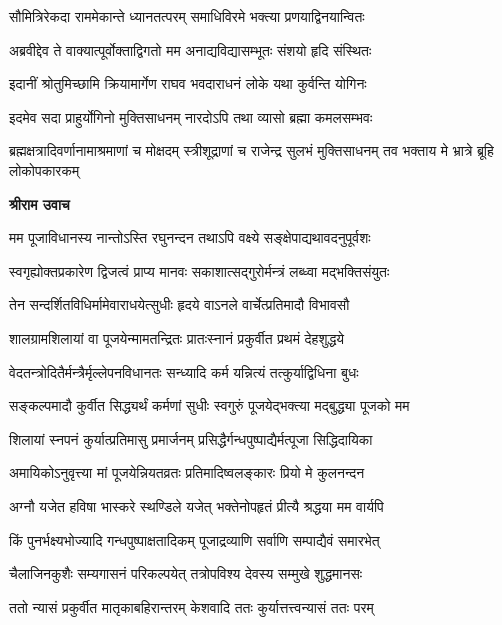 \twolineshloka
{सौमित्रिरेकदा राममेकान्ते ध्यानतत्परम्}
{समाधिविरमे भक्त्या प्रणयाद्विनयान्वितः} %

\twolineshloka
{अब्रवीद्देव ते वाक्यात्पूर्वोक्ताद्विगतो मम}
{अनाद्यविद्यासम्भूतः संशयो हृदि संस्थितः} %

\twolineshloka
{इदानीं श्रोतुमिच्छामि क्रियामार्गेण राघव}
{भवदाराधनं लोके यथा कुर्वन्ति योगिनः} %

\twolineshloka
{इदमेव सदा प्राहुर्योगिनो मुक्तिसाधनम्}
{नारदोऽपि तथा व्यासो ब्रह्मा कमलसम्भवः} %

\threelineshloka
{ब्रह्मक्षत्रादिवर्णानामाश्रमाणां च मोक्षदम्}
{स्त्रीशूद्राणां च राजेन्द्र सुलभं मुक्तिसाधनम्}
{तव भक्ताय मे भ्रात्रे ब्रूहि लोकोपकारकम्} %

\textbf{श्रीराम उवाच}

\twolineshloka
{मम पूजाविधानस्य नान्तोऽस्ति रघुनन्दन}
{तथाऽपि वक्ष्ये सङ्क्षेपाद्यथावदनुपूर्वशः} %

\twolineshloka
{स्वगृह्योक्तप्रकारेण द्विजत्वं प्राप्य मानवः}
{सकाशात्सद्गुरोर्मन्त्रं लब्ध्वा मद्भक्तिसंयुतः} %

\twolineshloka
{तेन सन्दर्शितविधिर्मामेवाराधयेत्सुधीः}
{हृदये वाऽनले वार्चेत्प्रतिमादौ विभावसौ} %

\twolineshloka
{शालग्रामशिलायां वा पूजयेन्मामतन्द्रितः}
{प्रातःस्नानं प्रकुर्वीत प्रथमं देहशुद्धये} %

\twolineshloka
{वेदतन्त्रोदितैर्मन्त्रैर्मृल्लेपनविधानतः}
{सन्ध्यादि कर्म यन्नित्यं तत्कुर्याद्विधिना बुधः} %

\twolineshloka
{सङ्कल्पमादौ कुर्वीत सिद्ध्यर्थं कर्मणां सुधीः}
{स्वगुरुं पूजयेद्भक्त्या मद्बुद्ध्या पूजको मम} %

\twolineshloka
{शिलायां स्नपनं कुर्यात्प्रतिमासु प्रमार्जनम्}
{प्रसिद्धैर्गन्धपुष्पाद्यैर्मत्पूजा सिद्धिदायिका} %

\twolineshloka
{अमायिकोऽनुवृत्त्या मां पूजयेन्नियतव्रतः}
{प्रतिमादिष्वलङ्कारः प्रियो मे कुलनन्दन} %

\twolineshloka
{अग्नौ यजेत हविषा भास्करे स्थण्डिले यजेत्}
{भक्तेनोपहृतं प्रीत्यै श्रद्धया मम वार्यपि} %

\twolineshloka
{किं पुनर्भक्ष्यभोज्यादि गन्धपुष्पाक्षतादिकम्}
{पूजाद्रव्याणि सर्वाणि सम्पाद्यैवं समारभेत्} %

\twolineshloka
{चैलाजिनकुशैः सम्यगासनं परिकल्पयेत्}
{तत्रोपविश्य देवस्य सम्मुखे शुद्धमानसः} %

\twolineshloka
{ततो न्यासं प्रकुर्वीत मातृकाबहिरान्तरम्}
{केशवादि ततः कुर्यात्तत्त्वन्यासं ततः परम्} %


